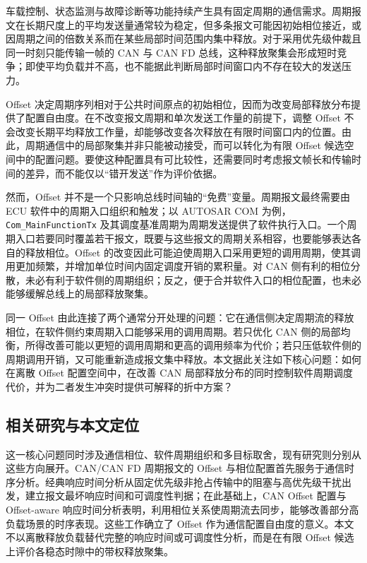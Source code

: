 \documentclass[UTF8,a4paper,twoside,zihao=-4]{ctexart}
\numberwithin{equation}{section}
\numberwithin{figure}{section}
\numberwithin{table}{section}
\theoremstyle{definition}
\numberwithin{algocf}{section}
\begin{document}
车载控制、状态监测与故障诊断等功能持续产生具有固定周期的通信需求。周期报文在长期尺度上的平均发送量通常较为稳定，但多条报文可能因初始相位接近，或因周期之间的倍数关系而在某些局部时间范围内集中释放。对于采用优先级仲裁且同一时刻只能传输一帧的 CAN 与 CAN FD 总线，这种释放聚集会形成短时竞争；即使平均负载并不高，也不能据此判断局部时间窗口内不存在较大的发送压力。

Offset 决定周期序列相对于公共时间原点的初始相位，因而为改变局部释放分布提供了配置自由度。在不改变报文周期和单次发送工作量的前提下，调整 Offset 不会改变长期平均释放工作量，却能够改变各次释放在有限时间窗口内的位置。由此，周期通信中的局部聚集并非只能被动接受，而可以转化为有限 Offset 候选空间中的配置问题。要使这种配置具有可比较性，还需要同时考虑报文帧长和传输时间的差异，而不能仅以“错开发送”作为评价依据。

然而，Offset 并不是一个只影响总线时间轴的“免费”变量。周期报文最终需要由 ECU 软件中的周期入口组织和触发；以 AUTOSAR COM 为例，\texttt{Com\_\allowbreak Main\allowbreak FunctionTx} 及其调度基准周期为周期发送提供了软件执行入口\cite{autosarcom}。一个周期入口若要同时覆盖若干报文，既要与这些报文的周期关系相容，也要能够表达各自的释放相位。Offset 的改变因此可能迫使周期入口采用更短的调用周期，使其调用更加频繁，并增加单位时间内固定调度开销的累积量。对 CAN 侧有利的相位分散，未必有利于软件侧的周期组织；反之，便于合并软件入口的相位配置，也未必能够缓解总线上的局部释放聚集。

同一 Offset 由此连接了两个通常分开处理的问题：它在通信侧决定周期流的释放相位，在软件侧约束周期入口能够采用的调用周期。若只优化 CAN 侧的局部均衡，所得改善可能以更短的调用周期和更高的调用频率为代价；若只压低软件侧的周期调用开销，又可能重新造成报文集中释放。本文据此关注如下核心问题：如何在离散 Offset 配置空间中，在改善 CAN 局部释放分布的同时控制软件周期调度代价，并为二者发生冲突时提供可解释的折中方案？

\subsection{相关研究与本文定位}

这一核心问题同时涉及通信相位、软件周期组织和多目标取舍，现有研究则分别从这些方向展开。CAN/CAN FD 周期报文的 Offset 与相位配置首先服务于通信时序分析。经典响应时间分析从固定优先级非抢占传输中的阻塞与高优先级干扰出发，建立报文最坏响应时间和可调度性判据\cite{tindell1994}；在此基础上，CAN Offset 配置与 Offset-aware 响应时间分析表明，利用相位关系使周期流去同步，能够改善部分高负载场景的时序表现\cite{grenier2008,yomsi2012}。这些工作确立了 Offset 作为通信配置自由度的意义。本文不以离散释放负载替代完整的响应时间或可调度性分析，而是在有限 Offset 候选上评价各稳态时隙中的带权释放聚集。
\end{document}

